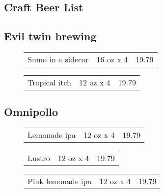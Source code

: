 \documentclass{article}%
\begin{document}
%
\pagestyle{empty}%
\normalsize%
%
\setlength{\columnseprule}{0.5pt}%
\setlength{\columnsep}{1cm}%
\begin{multicols}{3}%
\section*{Craft Beer List}%

%
\subsection*{Evil twin brewing}%
\begin{description}%
\item[]%
\begin{tabular}{l c r}%
Sumo in a sidecar&16 oz x 4&19.79\\%
\end{tabular}%
\item[]%
\begin{tabular}{l c r}%
Tropical itch&12 oz x 4&19.79\\%
\end{tabular}%
\end{description}

%
\subsection*{Omnipollo}%
\begin{description}%
\item[]%
\begin{tabular}{l c r}%
Lemonade ipa&12 oz x 4&19.79\\%
\end{tabular}%
\item[]%
\begin{tabular}{l c r}%
Lustro&12 oz x 4&19.79\\%
\end{tabular}%
\item[]%
\begin{tabular}{l c r}%
Pink lemonade ipa&12 oz x 4&19.79\\%
\end{tabular}%
\end{description}

%

\end{multicols}
\end{document}
